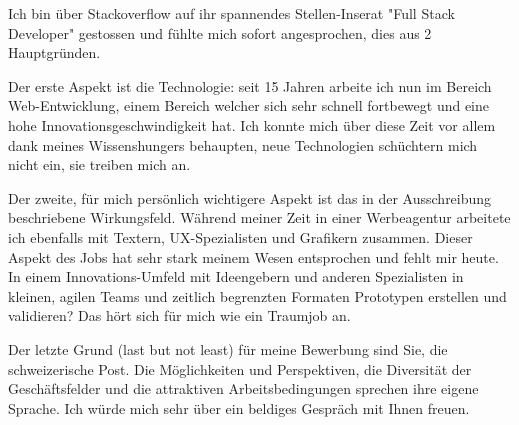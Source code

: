 \documentclass[11pt,a4paper,sans]{moderncv}
\begin{document}
Ich bin über Stackoverflow auf ihr spannendes Stellen-Inserat "Full Stack Developer" gestossen und fühlte mich sofort angesprochen, dies aus 2 Hauptgründen.

Der erste Aspekt ist die Technologie: seit 15 Jahren arbeite ich nun im Bereich Web-Entwicklung, einem Bereich welcher sich sehr schnell fortbewegt und eine hohe Innovationsgeschwindigkeit hat. Ich konnte mich über diese Zeit vor allem dank meines Wissenshungers behaupten, neue Technologien schüchtern mich nicht ein, sie treiben mich an.

Der zweite, für mich persönlich wichtigere Aspekt ist das in der Ausschreibung beschriebene Wirkungsfeld. Während meiner Zeit in einer Werbeagentur arbeitete ich ebenfalls mit Textern, UX-Spezialisten und Grafikern zusammen. Dieser Aspekt des Jobs hat sehr stark meinem Wesen entsprochen und fehlt mir heute. In einem Innovations-Umfeld mit Ideengebern und anderen Spezialisten in kleinen, agilen Teams und zeitlich begrenzten Formaten Prototypen erstellen und validieren? Das hört sich für mich wie ein Traumjob an.

Der letzte Grund (last but not least) für meine Bewerbung sind Sie, die schweizerische Post. Die Möglichkeiten und Perspektiven, die Diversität der Geschäftsfelder und die attraktiven Arbeitsbedingungen sprechen ihre eigene Sprache.
{\newline}{\newline}{\newline}
Ich würde mich sehr über ein beldiges Gespräch mit Ihnen freuen.
{\newline}{\newline}{\newline}
\makeletterclosing
\end{document}
